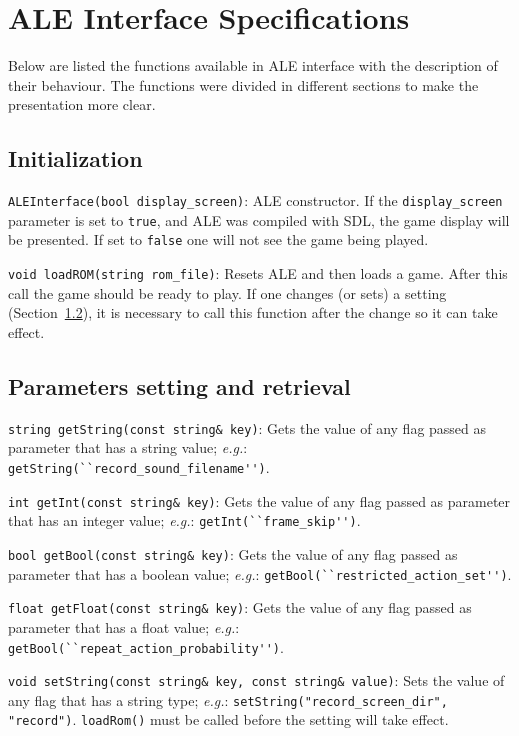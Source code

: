 \documentclass[12pt]{article}
\begin{document}
\section{ALE Interface Specifications}\label{sec:functions}

Below are listed the functions available in ALE interface with the description of their 
behaviour. The functions were divided in different sections to make the presentation more
clear.

  \subsection{Initialization}

  \indent \indent \verb+ALEInterface(bool display_screen)+: ALE constructor. If the 
  \verb+display_screen+ parameter is set to \verb+true+, and ALE was compiled
  with SDL, the game display will be presented. If set to \verb+false+ one will not see
  the game being played.
  
  \verb+void loadROM(string rom_file)+: Resets ALE and then loads a game. After this call
  the game should be ready to play. If one changes (or sets) a setting (Section~\ref{sec:getSet}), 
  it is necessary to call this function after the change so it can take effect.
  
  \subsection{Parameters setting and retrieval}\label{sec:getSet}
  
  \indent \indent \verb+string getString(const string& key)+: Gets the value of any flag passed
  as parameter that has a string value; \emph{e.g.}: \verb+getString(``record_sound_filename'')+.

  \verb+int getInt(const string& key)+: Gets the value of any flag passed as parameter that has 
  an integer value; \emph{e.g.}: \verb+getInt(``frame_skip'')+.

  \verb+bool getBool(const string& key)+: Gets the value of any flag passed as parameter that has 
  a boolean value; \emph{e.g.}: \verb+getBool(``restricted_action_set'')+. 
  
  \verb+float getFloat(const string& key)+: Gets the value of any flag passed as parameter that has 
  a float value; \emph{e.g.}: \verb+getBool(``repeat_action_probability'')+.   
  
  \verb+void setString(const string& key, const string& value)+: Sets the value of any flag
  that has a string type; \emph{e.g.}: \verb+setString("record_screen_dir", "record")+.
  \verb+loadRom()+ must be called before the setting will take effect.
  
\end{document}
